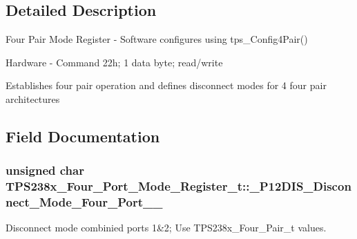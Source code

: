 \subsection{Detailed Description}
Four Pair Mode Register -\/ Software configures using tps\-\_\-\-Config4\-Pair() \par
 Hardware -\/ Command 22h; 1 data byte; read/write \par
\par
 Establishes four pair operation and defines disconnect modes for 4 four pair architectures 

\subsection{Field Documentation}
\hypertarget{struct_t_p_s238x___four___port___mode___register__t_a645698bd12e705f53aaf605d6ea8d5b6}{
\subsubsection[{\-\_\-4\-P12\-D\-I\-S\-\_\-\-Disconnect\-\_\-\-Mode\-\_\-\-Four\-\_\-\-Port\-\_\-1\-\_\-2}]{\setlength{\rightskip}{0pt plus 5cm}unsigned char T\-P\-S238x\-\_\-\-Four\-\_\-\-Port\-\_\-\-Mode\-\_\-\-Register\-\_\-t\-::\-\_\-P12\-D\-I\-S\-\_\-\-Disconnect\-\_\-\-Mode\-\_\-\-Four\-\_\-\-Port\-\_\-\_}}\label{struct_t_p_s238x___four___port___mode___register__t_a645698bd12e705f53aaf605d6ea8d5b6}


Disconnect mode combinied ports 1\&2; Use T\-P\-S238x\-\_\-\-Four\-\_\-\-Pair\-\_\-t values. 

